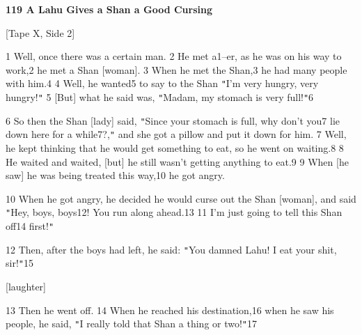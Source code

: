 
\textbf{119 A Lahu Gives a Shan a Good Cursing}

[Tape X, Side 2]

1 Well, once there was a certain man. 2 He met a1--er, as he was on his way to
work,2 he met a Shan [woman]. 3 When he met the Shan,3 he had many people with
him.4 4 Well, he wanted5 to say to the Shan \texttt{"}I'm very hungry, very hungry!\texttt{"}
5 [But] what he said was, \texttt{"}Madam, my stomach is very full!\texttt{"}6

6 So then the Shan [lady] said, \texttt{"}Since your stomach is full, why don't
you7 lie down here for a while7?,\texttt{"} and she got a pillow and put it down
for him. 7 Well, he kept thinking that he would get something to eat, so he went
on waiting.8 8 He waited and waited, [but] he still wasn't getting anything to
eat.9 9 When [he saw] he was being treated this way,10 he got angry.

10 When he got angry, he decided he would curse out the Shan [woman], and said
\texttt{"}Hey, boys, boys12! You run along ahead.13 11 I'm just going to tell this
Shan off14 first!\texttt{"}

12 Then, after the boys had left, he said: \texttt{"}You damned Lahu! I eat your
shit, sir!\texttt{"}15

[laughter]

13 Then he went off. 14 When he reached his destination,16 when he saw his people,
he said, \texttt{"}I really told that Shan a thing or two!\texttt{"}17

